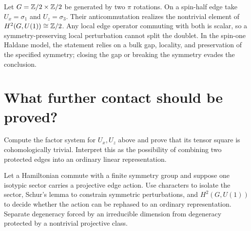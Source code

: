 Let $G=\mathbb Z/2\times\mathbb Z/2$ be generated by two $\pi$ rotations.  On a spin-half
edge take $U_x=\sigma_1$ and $U_z=\sigma_3$.  Their anticommutation realizes
the nontrivial element of $H^2(G,U(1))\cong\mathbb Z/2$.  Any local edge operator
commuting with both is scalar, so a symmetry-preserving local perturbation
cannot split the doublet.  In the spin-one Haldane model, the statement relies
on a bulk gap, locality, and preservation of the specified symmetry; closing
the gap or breaking the symmetry evades the conclusion.

\section{What further contact should be proved?}

\begin{exercise}
Compute the factor system for $U_x,U_z$ above and prove that its tensor square
is cohomologically trivial.  Interpret this as the possibility of combining
two protected edges into an ordinary linear representation.
\end{exercise}

\begin{exercise}
Let a Hamiltonian commute with a finite symmetry group and suppose one
isotypic sector carries a projective edge action.  Use characters to isolate
the sector, Schur's lemma to constrain symmetric perturbations, and
$H^2(G,U(1))$ to decide whether the action can be rephased to an ordinary
representation.  Separate degeneracy forced by an irreducible dimension from
degeneracy protected by a nontrivial projective class.
\end{exercise}

